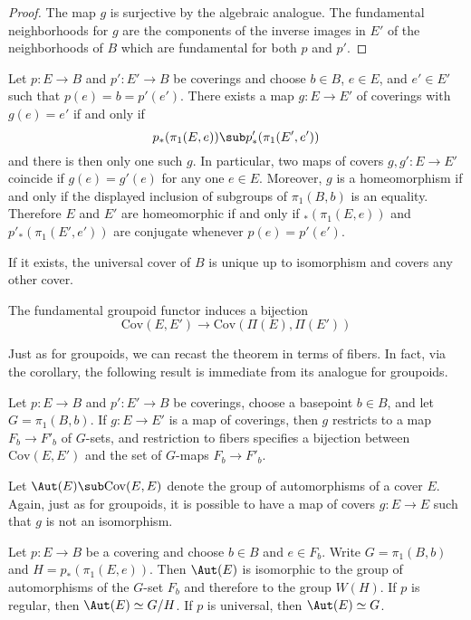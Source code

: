 \begin{proof}
The map $g$ is surjective by the algebraic analogue. The fundamental neighborhoods for $g$ are the components of the inverse images in $E'$ of the neighborhoods of $B$ which are fundamental for both $p$ and $p'$.
\end{proof}
\begin{theorem}
Let $p:E\to B$ and $p':E'\to B$ be coverings and choose $b\in B$, $e\in E$, and $e'\in E'$ such that $p(e)=b=p'(e')$. There exists a map $g:E\to E'$ of
coverings with $g(e)=e'$ if and only if
\[p_*(\pi_1(E,e))\sub p'_*(\pi_1(E',e'))\]
and there is then only one such $g$. In particular, two maps of covers $g, g':E\to E'$ coincide if $g(e)=g'(e)$ for any one $e\in E$. Moreover, $g$ is a homeomorphism if and only if the displayed inclusion of subgroups of $\pi_1(B,b)$ is an equality. Therefore $E$ and $E'$ are homeomorphic if and only if $_*(\pi_1(E,e))$ and $p'_*(\pi_1(E',e'))$ are conjugate whenever $p(e)=p'(e')$.
\end{theorem}
\begin{corollary}
If it exists, the universal cover of $B$ is unique up to isomorphism and covers any other cover.
\end{corollary}
\begin{corollary}
The fundamental groupoid functor induces a bijection
\[\mathrm{Cov}(E,E')\to\mathrm{Cov}(\Pi(E),\Pi(E'))\]
\end{corollary}
Just as for groupoids, we can recast the theorem in terms of fibers. In fact,
via the corollary, the following result is immediate from its analogue for groupoids.
\begin{theorem}
Let $p:E\to B$ and $p':E'\to B$ be coverings, choose a basepoint $b\in B$, and let $G=\pi_1(B,b)$. If $g:E\to E'$ is a map of coverings, then $g$ restricts to a map $F_b\to F'_b$ of $G$-sets, and restriction to fibers specifies a bijection between $\mathrm{Cov}(E,E')$ and the set of $G$-maps $F_b\to F'_b$.
\end{theorem}
\begin{definition}
Let $\Aut(E)\sub\mathrm{Cov}(E,E)$ denote the group of automorphisms of a cover $E$. Again, just as for groupoids, it is possible to have a map of covers
$g:E\to E$ such that $g$ is not an isomorphism.
\end{definition}
\begin{corollary}
Let $p:E\to B$ be a covering and choose $b\in B$ and $e\in F_b$. Write $G=\pi_1(B,b)$ and $H=p_*(\pi_1(E,e))$. Then $\Aut(E)$ is isomorphic to the
group of automorphisms of the $G$-set $F_b$ and therefore to the group $W(H)$. If $p$ is regular, then $\Aut(E)\simeq G/H$. If $p$ is universal, then $\Aut(E)\simeq G$.
\end{corollary}
